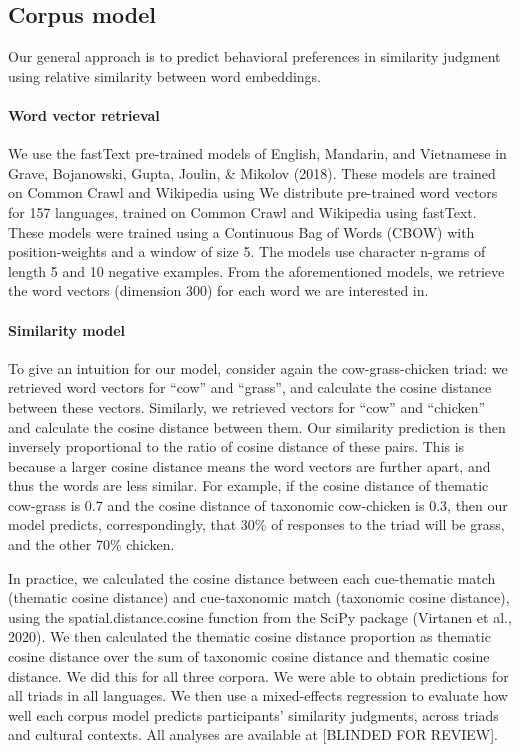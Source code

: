 \documentclass[10pt, letterpaper]{article}
\begin{document}
\hypertarget{corpus-model}{%
\subsection{Corpus model}\label{corpus-model}}

Our general approach is to predict behavioral preferences in similarity
judgment using relative similarity between word embeddings.

\hypertarget{word-vector-retrieval}{%
\paragraph{Word vector retrieval}\label{word-vector-retrieval}}

We use the fastText pre-trained models of English, Mandarin, and
Vietnamese in Grave, Bojanowski, Gupta, Joulin, \& Mikolov (2018). These
models are trained on Common Crawl and Wikipedia using We distribute
pre-trained word vectors for 157 languages, trained on Common Crawl and
Wikipedia using fastText. These models were trained using a Continuous
Bag of Words (CBOW) with position-weights and a window of size 5. The
models use character n-grams of length 5 and 10 negative examples. From
the aforementioned models, we retrieve the word vectors (dimension 300)
for each word we are interested in.

\hypertarget{similarity-model}{%
\paragraph{Similarity model}\label{similarity-model}}

To give an intuition for our model, consider again the cow-grass-chicken
triad: we retrieved word vectors for ``cow'' and ``grass'', and
calculate the cosine distance between these vectors. Similarly, we
retrieved vectors for ``cow'' and ``chicken'' and calculate the cosine
distance between them. Our similarity prediction is then inversely
proportional to the ratio of cosine distance of these pairs. This is
because a larger cosine distance means the word vectors are further
apart, and thus the words are less similar. For example, if the cosine
distance of thematic cow-grass is 0.7 and the cosine distance of
taxonomic cow-chicken is 0.3, then our model predicts, correspondingly,
that 30\% of responses to the triad will be grass, and the other 70\%
chicken.

In practice, we calculated the cosine distance between each cue-thematic
match (thematic cosine distance) and cue-taxonomic match (taxonomic
cosine distance), using the spatial.distance.cosine function from the
SciPy package (Virtanen et al., 2020). We then calculated the thematic
cosine distance proportion as thematic cosine distance over the sum of
taxonomic cosine distance and thematic cosine distance. We did this for
all three corpora. We were able to obtain predictions for all triads in
all languages. We then use a mixed-effects regression to evaluate how
well each corpus model predicts participants' similarity judgments,
across triads and cultural contexts. All analyses are available at
{[}BLINDED FOR REVIEW{]}.
\end{document}
